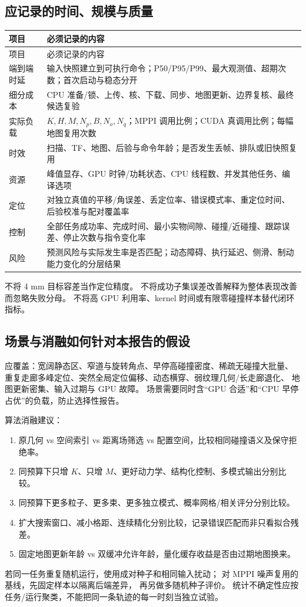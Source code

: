\subsection{应记录的时间、规模与质量}
\begin{longtable}{p{}p{}}
\toprule 项目 & 必须记录的内容\\\midrule\endfirsthead
\toprule 项目 & 必须记录的内容\\\midrule\endhead
端到端时延 & 输入快照建立到可执行命令；P50/P95/P99、最大观测值、超期次数；首次启动与稳态分开\\
细分成本 & CPU 准备/锁、上传、核、下载、同步、地图更新、边界复核、最终候选复验\\
实际负载 & $K,H,M,N_p,B,N_o,N_q$；MPPI 调用比例；CUDA 真调用比例；每幅地图复用次数\\
时效 & 扫描、TF、地图、后验与命令年龄；是否发生丢帧、排队或旧快照复用\\
资源 & 峰值显存、GPU 时钟/功耗状态、CPU 线程数、并发其他任务、编译选项\\
定位 & 对独立真值的平移/角误差、丢定位率、错误模式率、重定位时间、后验校准与配对覆盖率\\
控制 & 全部任务成功率、完成时间、最小实物间隙、碰撞/近碰撞、跟踪误差、停止次数与指令变化率\\
风险 & 预测风险与实际发生率是否匹配；动态障碍、执行延迟、侧滑、制动能力变化的分层结果\\
\bottomrule
\end{longtable}
不将 4 mm 目标容差当作定位精度。
不将成功子集误差改善解释为整体表现改善而忽略失败分母。
不将高 GPU 利用率、kernel 时间或有限零碰撞样本替代闭环指标。

\subsection{场景与消融如何针对本报告的假设}
应覆盖：宽阔静态区、窄道与旋转角点、早停高碰撞密度、稀疏无碰撞大批量、
重复走廊多峰定位、突然全局定位偏移、动态横穿、弱纹理几何/长走廊退化、
地图更新密集、输入过期与 GPU 故障。
场景需要同时含“GPU 合适”和“CPU 早停占优”的负载，防止选择性报告。

算法消融建议：
\begin{enumerate}
\item 原几何 vs 空间索引 vs 距离场筛选 vs 配置空间，比较相同碰撞语义及保守拒绝率。
\item 同预算下只增 $K$、只增 $M$、更好动力学、结构化控制、多模式输出分别比较。
\item 同预算下更多粒子、更多束、更多独立模式、概率网格/相关评分分别比较。
\item 扩大搜索窗口、减小格距、连续精化分别比较，记录错误匹配而非只看拟合残差。
\item 固定地图更新年龄 vs 双缓冲允许年龄，量化缓存收益是否由过期地图换来。
\end{enumerate}
若同一任务重复随机运行，使用成对种子和相同输入扰动；
对 MPPI 噪声复用的基线，先固定样本以隔离后端差异，
再另做多随机种子评价。
统计不确定性应按任务/运行聚类，不能把同一条轨迹的每一时刻当独立试验。

